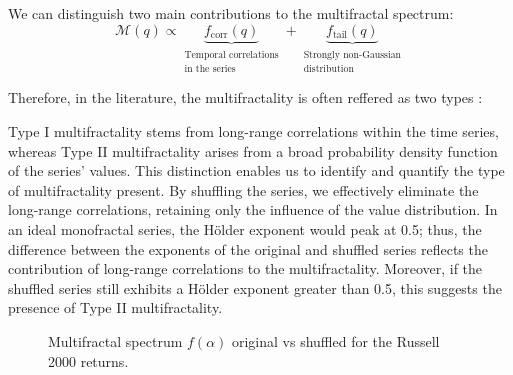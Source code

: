 \documentclass[11pt]{extarticle}
\begin{document}
We can distinguish two main contributions to the multifractal spectrum:
\[
\mathcal{M}(q) \propto \underbrace{f_{\text{corr}}(q)}_{\substack{\text{Temporal correlations} \\ \text{in the series}}} + \underbrace{f_{\text{tail}}(q)}_{\substack{\text{Strongly non-Gaussian} \\ \text{distribution}}}
\]

Therefore, in the literature, the multifractality is often reffered as two types :

Type I multifractality stems from long-range correlations within the time series, whereas Type II multifractality arises
from a broad probability density function of the series' values. This distinction enables us to identify and quantify
the type of multifractality present. By shuffling the series, we effectively eliminate the long-range correlations,
retaining only the influence of the value distribution. In an ideal monofractal series, the Hölder exponent would peak
at 0.5; thus, the difference between the exponents of the original and shuffled series reflects the contribution of
long-range correlations to the multifractality. Moreover, if the shuffled series still exhibits a Hölder exponent
greater than 0.5, this suggests the presence of Type II multifractality.



\begin{figure}[htbp]
    \centering
    \caption{Multifractal spectrum $f(\alpha)$ original vs shuffled for the Russell 2000 returns.}
\end{figure}
\end{document}
